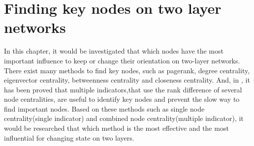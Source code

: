 
\chapter{Finding key nodes on two layer networks}
\label{chap:finding key nodes on two layer networks}
In this chapter, it would be investigated that which nodes have the most important influence to keep or change their orientation on two-layer networks. There exist many methods to find key nodes, such as pagerank, degree centrality, eigenvector centrality, betweenness centrality and closeness centrality. And, in \parencite{mesgari2015, huang2014}, it has been proved that multiple indicators,that use the rank difference of several node centralities, are useful to identify key nodes and prevent the slow way to find important nodes. Based on these methods such as single node centrality(single indicator) and combined node centrality(multiple indicator), it would be researched that which method is the most effective and the most influential for changing state on two layers.  

